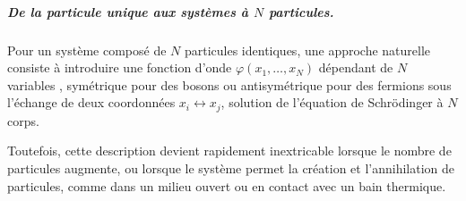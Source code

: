 \subparagraph{De la particule unique aux systèmes à $N$ particules.}

Pour un système composé de $N$ particules identiques, une approche naturelle consiste à introduire une fonction d’onde $\varphi(x_1, \dots, x_N)$ dépendant de $N$ variables , symétrique pour des bosons ou antisymétrique pour des fermions sous l’échange de deux coordonnées $x_i \leftrightarrow x_j$, solution de l’équation de Schrödinger à $N$ corps. %


Toutefois, cette description devient rapidement inextricable lorsque le nombre de particules augmente, ou lorsque le système permet la création et l’annihilation de particules, comme dans un milieu ouvert ou en contact avec un bain thermique.

